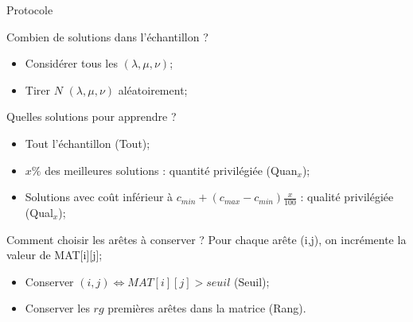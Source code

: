 \documentclass{beamer}
\begin{document}
\begin{frame}{Protocole}

\begin{block}{Combien de solutions dans l'échantillon ?}
\begin{itemize}
\item Considérer tous les $(\lambda,\mu,\nu)$;
\item Tirer $N$ $(\lambda,\mu,\nu)$ aléatoirement;
\end{itemize}
\end{block}

\begin{block}{Quelles solutions pour apprendre ?}
\begin{itemize}
\item Tout l'échantillon (Tout);
\item $x\%$ des meilleures solutions : quantité privilégiée (Quan$_{x}$);
\item Solutions avec coût inférieur à $c_{min} + (c_{max}-c_{min})\frac{x}{100}$ : qualité privilégiée (Qual$_{x}$);
\end{itemize}
\end{block}

\begin{block}{Comment choisir les arêtes à conserver ?}
Pour chaque arête (i,j), on incrémente la valeur de MAT[i][j];
\begin{itemize}
\item Conserver $(i,j) \Leftrightarrow MAT[i][j] > seuil$ (Seuil);
\item Conserver les $rg$ premières arêtes dans la matrice (Rang).
\end{itemize}
\end{block}


\end{frame}
\end{document}
